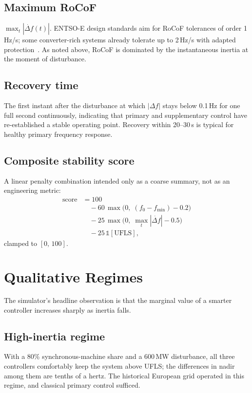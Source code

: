 \documentclass[conference]{IEEEtran}
\begin{document}
\subsection{Maximum RoCoF}
$\max_t |\dot{\Delta f}(t)|$. ENTSO-E design standards aim for RoCoF tolerances of order 1\,Hz/s; some converter-rich systems already tolerate up to 2\,Hz/s with adapted protection~\cite{entsoe2020inertia}. As noted above, RoCoF is dominated by the instantaneous inertia at the moment of disturbance.

\subsection{Recovery time}
The first instant after the disturbance at which $|\Delta f|$ stays below 0.1\,Hz for one full second continuously, indicating that primary and supplementary control have re-established a stable operating point. Recovery within 20--30\,s is typical for healthy primary frequency response.

\subsection{Composite stability score}
A linear penalty combination intended only as a coarse summary, not as an engineering metric:
\begin{equation}
\begin{aligned}
\text{score} &= 100 \\
&\quad - 60\,\max\bigl(0,\;(f_0 - f_{\min}) - 0.2\bigr)\\
&\quad - 25\,\max\bigl(0,\;\max_t|\dot{\Delta f}| - 0.5\bigr)\\
&\quad - 25\,\mathbb{1}[\text{UFLS}],
\end{aligned}
\end{equation}
clamped to $[0,\,100]$.

\section{Qualitative Regimes}\label{sec:regimes}
The simulator's headline observation is that the marginal value of a smarter controller increases sharply as inertia falls.

\subsection{High-inertia regime}
With a 80\% synchronous-machine share and a 600\,MW disturbance, all three controllers comfortably keep the system above UFLS; the differences in nadir among them are tenths of a hertz. The historical European grid operated in this regime, and classical primary control sufficed.
\end{document}
